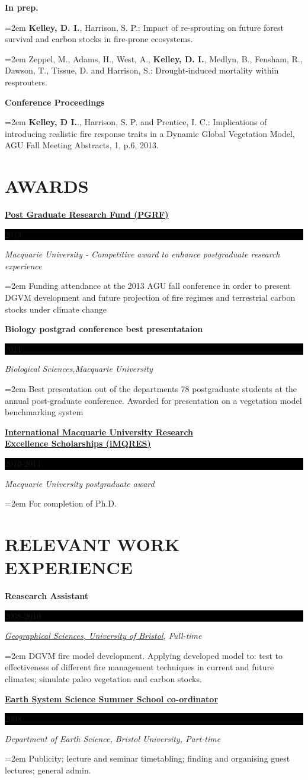 \documentclass[paper=a4,fontsize=11pt]{scrartcl}	 			%
\newcommand{\sepspace}{\vspace*{1em}}			%
\newcommand{\NewPart}[1]{\section*{\uppercase{#1}}}
\newcommand{\EducationEntry}[4]{
		\noindent \textbf{#1} \hfill 					%
		\colorbox{Black}{%
			\parbox{6.5em}{%
			\hfill\color{White}#2}} \par				%
		\noindent \textit{#3} \par					%
		\noindent\hangindent=2em\hangafter=0 \small #4 	%
		\normalsize \par}
\newcommand{\BibEntry}[2]{
		\noindent \textbf{#1} \hfill \par					%
		\noindent\hangindent=2em\hangafter=0 \small #2 	%
		\normalsize \par}
\begin{document}
\BibEntry{In prep.} {\textbf{Kelley, D. I.}, Harrison, S. P.: Impact of re-sprouting on future forest survival and carbon stocks in fire-prone ecosystems.}

\BibEntry{} {Zeppel, M., Adams, H., West, A., \textbf{Kelley, D. I.}, Medlyn, B., Fensham, R., Dawson, T., Tissue, D. and Harrison, S.: Drought-induced mortality within resprouters.}
\sepspace

\BibEntry{Conference Proceedings} {\textbf{Kelley, D I.}., Harrison, S. P. and Prentice, I. C.: Implications of introducing realistic fire response traits in a Dynamic Global Vegetation Model, AGU Fall Meeting Abstracts, 1,  p.6, 2013.}

\NewPart{Awards}
\EducationEntry{\href{http://www.hdr.mq.edu.au/information_for/current_candidates/financial_support}{Post Graduate Research Fund (PGRF)}}{2013} {Macquarie University - Competitive award to enhance postgraduate research experience}{Funding attendance at the 2013 AGU fall conference in order to present DGVM development and future projection of fire regimes and terrestrial carbon stocks under climate change}
\sepspace
\EducationEntry{Biology postgrad conference best presentataion}{2011} {Biological Sciences,Macquarie University}{Best presentation out of the departments 78 postgraduate students at the annual post-graduate conference. Awarded for presentation on a vegetation model benchmarking system}
\sepspace
\EducationEntry{\href{http://www.hdr.mq.edu.au/information_about/scholarships}{International Macquarie University Research \\ Excellence Scholarships (iMQRES)}}{2010-2014} {Macquarie University postgraduate award}{For completion of Ph.D.}


\NewPart{Relevant Work experience}{}

\EducationEntry{Reasearch Assistant}{2008-2010}{\href{http://www.bristol.ac.uk/geography/} {Geographical Sciences, University of Bristol}, Full-time}
  {DGVM fire model development. Applying developed model to: test to effectiveness of different fire management techniques in current and future climates; simulate paleo vegetation and carbon stocks.}
\sepspace
\pagebreak
\EducationEntry{\href{http://www.greencycles.org/greencycles1/ES4\%20flyer\_2008.pdf}{Earth System Science Summer School co-ordinator}}{2008}{Department of Earth Science, Bristol University, Part-time}{Publicity; lecture and seminar timetabling; finding and organising guest lectures; general admin.}
\sepspace 
%
\end{document}
